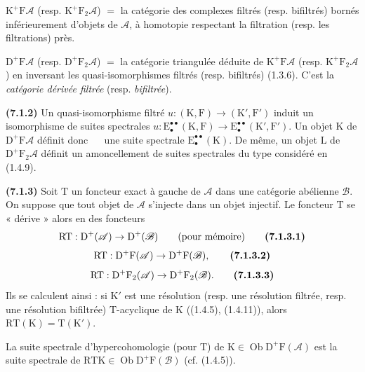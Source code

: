 \documentclass[11pt,leqno]{article}
\newcommand{\Page}[1]{\ifvmode\noindent\else\unskip\ \fi{\footnotesize\textcolor{gray}{[p.\,#1]}}\ \ignorespaces}
\begin{document}
\noindent
\(\mathrm{K}^{+}\mathrm{F}\mathscr{A}\) (resp. \(\mathrm{K}^{+}\mathrm{F}_2\mathscr{A}\)) \(=\) la catégorie des complexes filtrés (resp. bifiltrés) bornés inférieurement d’objets de \(\mathscr{A}\), à homotopie respectant la filtration (resp. les filtrations) près.

\noindent
\(\mathrm{D}^{+}\mathrm{F}\mathscr{A}\) (resp. \(\mathrm{D}^{+}\mathrm{F}_2\mathscr{A}\)) \(=\) la catégorie triangulée déduite de \(\mathrm{K}^{+}\mathrm{F}\mathscr{A}\) (resp. \(\mathrm{K}^{+}\mathrm{F}_2\mathscr{A}\)) en inversant les quasi-isomorphismes filtrés (resp. bifiltrés) (1.3.6). C’est la \textit{catégorie dérivée filtrée} (resp. \textit{bifiltrée}).

\textbf{(7.1.2)} Un quasi-isomorphisme filtré \(u:(\mathrm{K},\mathrm{F})\to(\mathrm{K}',\mathrm{F}')\) induit un isomorphisme de suites spectrales \(u:\mathrm{E}_{\bullet}^{\bullet\bullet}(\mathrm{K},\mathrm{F})\to\mathrm{E}_{\bullet}^{\bullet\bullet}(\mathrm{K}',\mathrm{F}')\). Un objet \(\mathrm{K}\) de \(\mathrm{D}^{+}\mathrm{F}\mathscr{A}\) définit donc
\Page{24}
une suite spectrale \(\mathrm{E}_{\bullet}^{\bullet\bullet}(\mathrm{K})\). De même, un objet \(\mathrm{L}\) de \(\mathrm{D}^{+}\mathrm{F}_2\mathscr{A}\) définit un amoncellement de suites spectrales du type considéré en (1.4.9).

\textbf{(7.1.3)} Soit \(\mathrm{T}\) un foncteur exact à gauche de \(\mathscr{A}\) dans une catégorie abélienne \(\mathscr{B}\). On suppose que tout objet de \(\mathscr{A}\) s’injecte dans un objet injectif. Le foncteur \(\mathrm{T}\) se « dérive » alors en des foncteurs
\[
\mathrm{RT}:\mathrm{D}^{+}(\mathscr{A})\to\mathrm{D}^{+}(\mathscr{B})
\qquad\text{(pour mémoire)}
\tag*{\textbf{(7.1.3.1)}}
\]
\[
\mathrm{RT}:\mathrm{D}^{+}\mathrm{F}(\mathscr{A})
\to\mathrm{D}^{+}\mathrm{F}(\mathscr{B}),
\tag*{\textbf{(7.1.3.2)}}
\]
\[
\mathrm{RT}:\mathrm{D}^{+}\mathrm{F}_2(\mathscr{A})
\to\mathrm{D}^{+}\mathrm{F}_2(\mathscr{B}).
\tag*{\textbf{(7.1.3.3)}}
\]
Ils se calculent ainsi : si \(\mathrm{K}'\) est une résolution (resp. une résolution filtrée, resp. une résolution bifiltrée) \(\mathrm{T}\)-acyclique de \(\mathrm{K}\) ((1.4.5), (1.4.11)), alors \(\mathrm{RT}(\mathrm{K})=\mathrm{T}(\mathrm{K}')\).

La suite spectrale d’hypercohomologie (pour \(\mathrm{T}\)) de \(\mathrm{K}\in\operatorname{Ob}\mathrm{D}^{+}\mathrm{F}(\mathscr{A})\) est la suite spectrale de \(\mathrm{RTK}\in\operatorname{Ob}\mathrm{D}^{+}\mathrm{F}(\mathscr{B})\) (cf. (1.4.5)).
\end{document}
